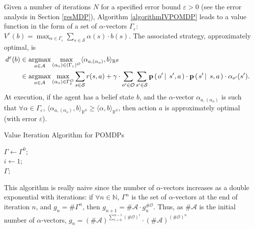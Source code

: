 Given a number of iterations $N$ 
for a specified error bound $\varepsilon>0$ 
(see the error analysis in Section \ref{resMDP}), 
Algorithm \ref{algorithmIVPOMDP}
leads to a value function in the form of a set of $\alpha$-vectors $\Gamma_{\varepsilon}$:
$V^{\varepsilon}(b) = \max_{\alpha \in \Gamma_{\varepsilon}} \sum_{s \in \mathcal{S}} \alpha(s) \cdot b(s)$.
The associated strategy, approximately optimal, is 
\begin{align*}
 d^{\varepsilon}(b) & \in \operatorname*{argmax}_{a \in \mathcal{A}} \max_{ (\alpha_o) \in (\Gamma_{\varepsilon})^{\mathcal{O}}} \langle \alpha_{a,(\alpha_o)}, b \rangle_{\mathbb{R}^{\mathcal{S}}} \\
& \in \operatorname*{argmax}_{a \in \mathcal{A}} \max_{ (\alpha_o) \in \Gamma_{\varepsilon}^{\mathcal{O}}} \sum_{s \in \mathcal{S}} r(s,a) + \gamma \cdot \sum_{o' \in \mathcal{O}} \sum_{s' \in \mathcal{S}} \textbf{p} \left( \left. o' \, \right| \left. \, s',a \right. \right) \cdot \textbf{p} \left( \left.  s' \, \right| \left. \, s ,a   \right. \right) \cdot \alpha_{o'}(s').
\end{align*}
At execution, if the agent has a belief state $b$,
and the $\alpha$-vector $\alpha_{a,(\alpha_o)}$ 
is such that $\forall \alpha \in \Gamma_{\varepsilon}$, $\langle \alpha_{a,(\alpha_o)}, b \rangle_{\mathbb{R}^{\mathcal{S}}} \geqslant \langle \alpha , b \rangle_{\mathbb{R}^{\mathcal{S}}}$,
then action $a$ is approximately optimal (with error $\varepsilon$).

\begin{algorithm} \caption{Value Iteration Algorithm for POMDPs} 
\label{algorithmIVPOMDP}
$\Gamma \gets \Gamma^0$; \\
$i \gets 1$; \\
\Return $\Gamma$;
\end{algorithm}

This algorithm is really naive since the number of $\alpha$-vectors 
increases as a double exponential with iterations: if $\forall n \in \mathbb{N}$, 
$\Gamma^n$ is the set of $\alpha$-vectors 
at the end of iteration $n$, and $g_n = \# \Gamma^n$, 
then $g_{n+1}=\# \mathcal{A} \cdot g_{n}^{\#\mathcal{O}}$. 
Thus, as $\# \mathcal{A}$ is the initial number of $\alpha$-vectors,
$g_n = (\# \mathcal{A})^{\sum_{i=0}^{n-1} (\# \mathcal{O})^i} \cdot (\# \mathcal{A})^{(\# \mathcal{O})^n}$

